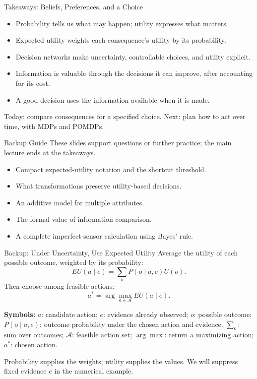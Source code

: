 \documentclass[aspectratio=169,10pt]{beamer}
\newcommand{\equationlegend}[1]{%
  \par\smallskip
  \begingroup
    \setlength{\fboxsep}{4pt}%
    \noindent\colorbox{DeckSoft}{%
      \parbox{\dimexpr\linewidth-2\fboxsep\relax}{%
        \footnotesize\textbf{Symbols:} #1%
      }%
    }\par
  \endgroup
  \smallskip
}
\begin{document}
\begin{frame}{Takeaways: Beliefs, Preferences, and a Choice}
  \begin{itemize}
    \item Probability tells us what may happen; utility expresses what matters.
    \item Expected utility weights each consequence's utility by its probability.
    \item Decision networks make uncertainty, controllable choices, and utility explicit.
    \item Information is valuable through the decisions it can improve, after accounting for its cost.
    \item A good decision uses the information available when it is made.
  \end{itemize}
  \begin{keyidea}
    Today: compare consequences for a specified choice. Next: plan how to act over time, with MDPs and POMDPs.
  \end{keyidea}
\end{frame}

\appendix
{}

\begin{frame}{Backup Guide}
  These slides support questions or further practice; the main lecture ends at the takeaways.
  \begin{itemize}
    \item Compact expected-utility notation and the shortcut threshold.
    \item What transformations preserve utility-based decisions.
    \item An additive model for multiple attributes.
    \item The formal value-of-information comparison.
    \item A complete imperfect-sensor calculation using Bayes' rule.
  \end{itemize}
\end{frame}
\begin{frame}[t]{Backup: Under Uncertainty, Use Expected Utility}
  \small
  Average the utility of each possible outcome, weighted by its probability:
  \[
    EU(a\mid e)=\sum_o P(o\mid a,e)U(o).
  \]
  Then choose among feasible actions:
  \[
    a^*=\arg\max_{a\in\mathcal{A}} EU(a\mid e).
  \]
  \equationlegend{$a$: candidate action; $e$: evidence already observed; $o$: possible outcome; $P(o\mid a,e)$: outcome probability under the chosen action and evidence. $\sum_o$: sum over outcomes; $\mathcal{A}$: feasible action set; $\arg\max$: return a maximizing action; $a^*$: chosen action.}
  \begin{keyidea}
    Probability supplies the weights; utility supplies the values. We will suppress fixed evidence $e$ in the numerical example.
  \end{keyidea}
\end{frame}
\end{document}

